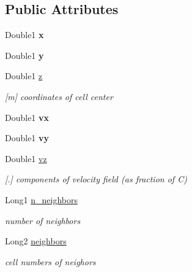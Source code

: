 \subsection*{Public Attributes}
\begin{DoxyCompactItemize}
\item 
\mbox{\label{structCells_ab8765ffff4b6d4821875252904912af4}} 
Double1 {\bfseries x}
\item 
\mbox{\label{structCells_ad36a58579efd1cb28eb0308dd4439660}} 
Double1 {\bfseries y}
\item 
\mbox{\label{structCells_aba848aff3e5c78cc71dd284b2c30db2c}} 
Double1 \mbox{\hyperlink{structCells_aba848aff3e5c78cc71dd284b2c30db2c}{z}}
\begin{DoxyCompactList}\small\item\em \mbox{[}m\mbox{]} coordinates of cell center \end{DoxyCompactList}\item 
\mbox{\label{structCells_af0dfa925987e11c540f1d72c62c663b0}} 
Double1 {\bfseries vx}
\item 
\mbox{\label{structCells_a861e9079fce24b334630c83df38720b7}} 
Double1 {\bfseries vy}
\item 
\mbox{\label{structCells_a4095bd91644a89f9a1b47ea403f88126}} 
Double1 \mbox{\hyperlink{structCells_a4095bd91644a89f9a1b47ea403f88126}{vz}}
\begin{DoxyCompactList}\small\item\em \mbox{[}.\mbox{]} components of velocity field (as fraction of C) \end{DoxyCompactList}\item 
\mbox{\label{structCells_a446105841ae435ffe70b74f9e75e65d3}} 
Long1 \mbox{\hyperlink{structCells_a446105841ae435ffe70b74f9e75e65d3}{n\+\_\+neighbors}}
\begin{DoxyCompactList}\small\item\em number of neighbors \end{DoxyCompactList}\item 
\mbox{\label{structCells_ae979bf26bc664992f6442e8431735fd5}} 
Long2 \mbox{\hyperlink{structCells_ae979bf26bc664992f6442e8431735fd5}{neighbors}}
\begin{DoxyCompactList}\small\item\em cell numbers of neighors \end{DoxyCompactList}\end{DoxyCompactItemize}



